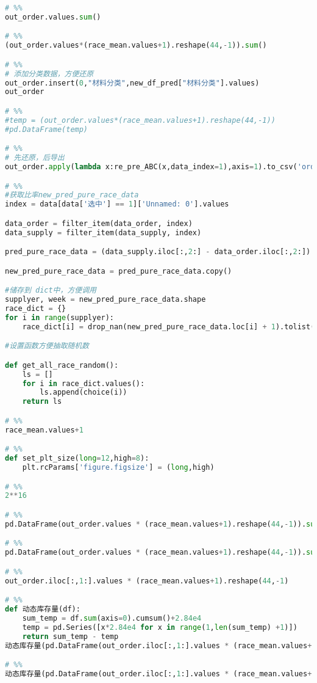 \begin{appendices}
\begin{lstlisting}[language=python]
# %%
out_order.values.sum()

# %%
(out_order.values*(race_mean.values+1).reshape(44,-1)).sum()

# %%
# 添加分类数据，方便还原
out_order.insert(0,"材料分类",new_df_pred["材料分类"].values)
out_order

# %%
#temp = (out_order.values*(race_mean.values+1).reshape(44,-1))
#pd.DataFrame(temp)

# %%
# 先还原，后导出
out_order.apply(lambda x:re_pre_ABC(x,data_index=1),axis=1).to_csv('order_24_week.csv')

# %%
#获取比率new_pred_pure_race_data
index = data[data['选中'] == 1]['Unnamed: 0'].values

data_order = filter_item(data_order, index)
data_supply = filter_item(data_supply, index)

pred_pure_race_data = (data_supply.iloc[:,2:] - data_order.iloc[:,2:]) / data_order.iloc[:,2:]

new_pred_pure_race_data = pred_pure_race_data.copy()

#储存到 dict中，方便调用
supplyer, week = new_pred_pure_race_data.shape
race_dict = {}
for i in range(supplyer):
    race_dict[i] = drop_nan(new_pred_pure_race_data.loc[i] + 1).tolist()

#设置函数方便抽取随机数

def get_all_race_random():
    ls = []
    for i in race_dict.values():
        ls.append(choice(i))
    return ls

# %%
race_mean.values+1

# %%
def set_plt_size(long=12,high=8):
    plt.rcParams['figure.figsize'] = (long,high)

# %%
2**16

# %%
pd.DataFrame(out_order.values * (race_mean.values+1).reshape(44,-1)).sum(axis=0).cumsum() + 2.84e4 - pd.Series([x*2.84e4 for x in range(1,24+1)])

# %%
pd.DataFrame(out_order.values * (race_mean.values+1).reshape(44,-1)).sum(axis=0).cumsum() + 2.84e4

# %%
out_order.iloc[:,1:].values * (race_mean.values+1).reshape(44,-1)

# %%
def 动态库存量(df):
    sum_temp = df.sum(axis=0).cumsum()+2.84e4
    temp = pd.Series([x*2.84e4 for x in range(1,len(sum_temp) +1)])
    return sum_temp - temp
动态库存量(pd.DataFrame(out_order.iloc[:,1:].values * (race_mean.values+1).reshape(44,-1)))

# %%
动态库存量(pd.DataFrame(out_order.iloc[:,1:].values * (race_mean.values+1).reshape(44,-1))).values


\end{lstlisting}
\end{appendices}
